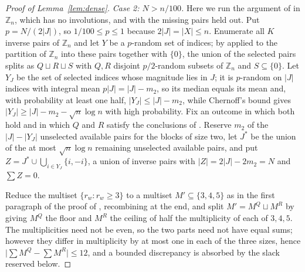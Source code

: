 \documentclass[11pt,a4paper]{article}
\theoremstyle{plain}
\theoremstyle{definition}
\theoremstyle{remark}
\newcommand{\Z}{\mathbb{Z}}
\begin{document}
\begin{proof}[Proof of Lemma~\ref{lem:dense}]
\emph{Case 2: $N>n/100$.}  Here we run the argument of
\cite[Lemma~6.27]{MuyesserPokrovskiy2025} in $\Z_n$, which has no involutions,
and with the missing pairs held out.  Put $p=N/(2|J|)$, so
$1/100\le p\le1$ because $2|J|=|X|\le n$.  Enumerate all $K$ inverse pairs of
$\Z_n$ and let $Y$ be a $p$-random set of indices; by
\cite[Lemma~6.26]{MuyesserPokrovskiy2025} applied to the partition of $\Z_n$
into these pairs together with $\{0\}$, the union of the selected pairs splits
as $Q\sqcup R\sqcup S$ with $Q,R$ disjoint $p/2$-random subsets of $\Z_n$ and
$S\subseteq\{0\}$.  Let $Y_J$ be the set of selected indices whose magnitude
lies in $J$; it is $p$-random on $|J|$ indices with integral mean
$p|J|=|J|-m_2$, so its median equals its mean and, with probability at least
one half, $|Y_J|\le|J|-m_2$, while Chernoff's bound gives
$|Y_J|\ge|J|-m_2-\sqrt{n}\log n$ with high probability.  Fix an outcome in
which both hold and in which $Q$ and $R$ satisfy the conclusions of
\cite[Lemmas~6.23 and~6.25]{MuyesserPokrovskiy2025}.  Reserve $m_2$ of the
$|J|-|Y_J|$ unselected available pairs for the blocks of size two, let $J^{*}$
be the union of the at most $\sqrt n\log n$ remaining unselected available
pairs, and put $Z=J^{*}\cup\bigcup_{i\in Y_J}\{i,-i\}$, a union of inverse
pairs with $|Z|=2|J|-2m_2=N$ and $\sum Z=0$.

Reduce the multiset $\{r_w:r_w\ge3\}$ to a multiset $M'\subseteq\{3,4,5\}$ as
in the first paragraph of the proof of
\cite[Lemma~6.25]{MuyesserPokrovskiy2025}, recombining at the end, and split
$M'=M^{Q}\sqcup M^{R}$ by giving $M^{Q}$ the floor and $M^{R}$ the ceiling of
half the multiplicity of each of $3,4,5$.  The multiplicities need not be even,
so the two parts need not have equal sums; however they differ in multiplicity
by at most one in each of the three sizes, hence
$\bigl|\sum M^{Q}-\sum M^{R}\bigr|\le12$, and a bounded discrepancy is
absorbed by the slack reserved below.


\end{proof}
\end{document}
